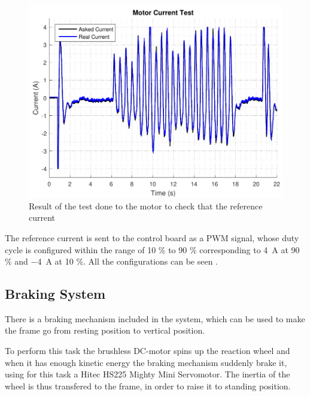 \begin{figure}[H]
	\includegraphics[scale=.75]{figures/motorCurrentTest}
	\centering
	\caption{Result of the test done to the motor to check that the reference current }
\end{figure} \label{motorCurrentTest2}

The reference current is sent to the control board as a PWM signal, whose duty cycle is configured within the range of 10 \% to 90 \% corresponding to \SI{4}{A} at 90 \% and \SI{-4}{A} at 10 \%. All the configurations can be seen .


\subsection{Braking System}
There is a braking mechanism included in the system, which can be used to make the frame go from resting position to vertical position.

To perform this task the brushless DC-motor spins up the reaction wheel and when it has enough kinetic energy the braking mechanism suddenly brake it, using for this task a Hitec HS225 Mighty Mini Servomotor. The inertia of the wheel is thus transfered to the frame, in order to raise it to standing position.


